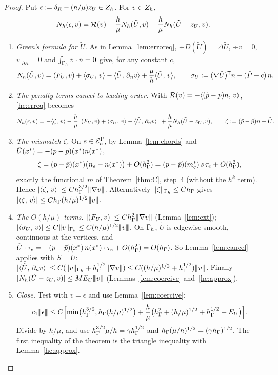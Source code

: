 \begin{proof}
Put $\epsilon:=\delta_R-(h/\mu)z_U\in Z_h$. For $v\in Z_h$,
\begin{equation}\label{hc:erreq}
N_h(\epsilon,v)=\mathcal R(v)-\frac h\mu N_h(\tilde U,v)+\frac h\mu N_h(\tilde U-z_U,v).
\end{equation}
\begin{enumerate}
\item \emph{Green's formula for $\tilde U$.} As in Lemma~\ref{lem:erroreq}, $\div D(\tilde U)=\Delta\tilde U$, $\div v=0$, $v|_{\partial R}=0$ and
$\int_{\Gamma_h}v\cdot n=0$ give, for any constant $c$,
\[
N_h(\tilde U,v)=(F_U,v)+\langle \sigma_U,\, v\rangle-\langle \tilde U,\, \partial_n v\rangle+\frac\mu h\langle \tilde U,\, v\rangle,\qquad
\sigma_U:=(\nabla\tilde U)^{\mathsf T}n-(\tilde P-c)\,n .
\]
\item \emph{The penalty terms cancel to leading order.} With $\mathcal R(v)=-\langle (\tilde p-\bar p)n,\, v\rangle$, \eqref{hc:erreq} becomes
\[
N_h(\epsilon,v)=-\langle \zeta,\, v\rangle-\frac h\mu\Bigl[(F_U,v)+\langle \sigma_U,\, v\rangle-\langle \tilde U,\, \partial_n v\rangle\Bigr]+\frac h\mu N_h(\tilde U-z_U,v),
\qquad \zeta:=(\tilde p-\bar p)n+\tilde U .
\]
\item \emph{The mismatch $\zeta$.} On $e\in\mathcal E_h^\Gamma$, by Lemma~\ref{lem:chords} and $\tilde U(x^\ast)=-(p-\bar p)(x^\ast)n(x^\ast)$,
\[
\zeta=(p-\bar p)(x^\ast)\bigl(n_e-n(x^\ast)\bigr)+O(h_\Gamma^2)=(p-\bar p)(m_e^\ast)\,s\,\tau_e+O(h_\Gamma^2),
\]
exactly the functional $m$ of Theorem~\ref{thm:C}, step~4 (without the $h^k$ term). Hence
$|\langle \zeta,\, v\rangle|\le Ch_\Gamma^{3/2}\lVert \nabla v\rVert$. Alternatively $\lVert \zeta\rVert_{\Gamma_h}\le Ch_\Gamma$ gives
$|\langle \zeta,\, v\rangle|\le Ch_\Gamma(h/\mu)^{1/2}|\!|\!|v|\!|\!|$.
\item \emph{The $O(h/\mu)$ terms.} $|(F_U,v)|\le Ch_\Gamma^2\lVert \nabla v\rVert$ (Lemma~\ref{lem:ext}); $|\langle \sigma_U,\, v\rangle|\le
C\lVert v\rVert_{\Gamma_h}\le C(h/\mu)^{1/2}|\!|\!|v|\!|\!|$. On $\Gamma_h$, $\tilde U$ is edgewise smooth, continuous at the vertices, and
$\tilde U\cdot\tau_e=-(p-\bar p)(x^\ast)\,n(x^\ast)\cdot\tau_e+O(h_\Gamma^2)=O(h_\Gamma)$. So Lemma~\ref{lem:cancel} applies with
$S=\tilde U$: $|\langle \tilde U,\, \partial_n v\rangle|\le C(\lVert v\rVert_{\Gamma_h}+h_\Gamma^{1/2}\lVert \nabla v\rVert)\le C((h/\mu)^{1/2}+h_\Gamma^{1/2})|\!|\!|v|\!|\!|$.
Finally $|N_h(\tilde U-z_U,v)|\le ME_U|\!|\!|v|\!|\!|$ (Lemmas~\ref{lem:coercive} and~\ref{hc:approx}).
\item \emph{Close.} Test with $v=\epsilon$ and use Lemma~\ref{lem:coercive}:
\[
c_1|\!|\!|\epsilon|\!|\!|\le C\Bigl[\min\bigl(h_\Gamma^{3/2},h_\Gamma(h/\mu)^{1/2}\bigr)+\frac h\mu\bigl(h_\Gamma^2+(h/\mu)^{1/2}+h_\Gamma^{1/2}+E_U\bigr)\Bigr].
\]
Divide by $h/\mu$, and use $h_\Gamma^{3/2}\mu/h=\gamma h_\Gamma^{1/2}$ and $h_\Gamma(\mu/h)^{1/2}=(\gamma h_\Gamma)^{1/2}$. The first inequality of the
theorem is the triangle inequality with Lemma~\ref{hc:approx}.\qedhere
\end{enumerate}
\end{proof}

